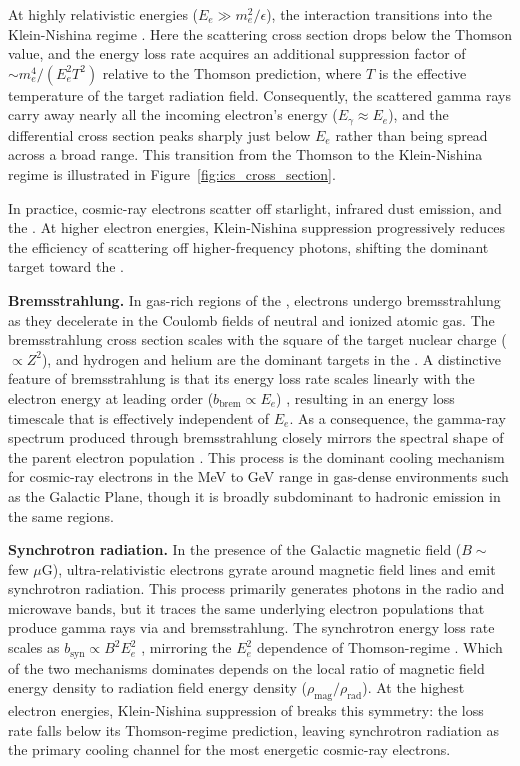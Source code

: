 At highly relativistic energies ($E_e \gg m_e^2/\epsilon$), the interaction transitions into the Klein-Nishina regime \cite{Hooper:2024}.
Here the scattering cross section drops below the Thomson value, and the energy loss rate acquires an additional suppression factor of $\sim m_e^4 / (E_e^2 T^2)$ relative to the Thomson prediction, where $T$ is the effective temperature of the target radiation field.
Consequently, the scattered gamma rays carry away nearly all the incoming electron's energy ($E_\gamma \approx E_e$), and the differential cross section peaks sharply just below $E_e$ rather than being spread across a broad range.
This transition from the Thomson to the Klein-Nishina regime is illustrated in Figure~\ref{fig:ics_cross_section}.

In practice, cosmic-ray electrons scatter off starlight, infrared dust emission, and the \CMB.
At higher electron energies, Klein-Nishina suppression progressively reduces the efficiency of scattering off higher-frequency photons, shifting the dominant \ICS target toward the \CMB.

\textbf{Bremsstrahlung.}
In gas-rich regions of the \ISM, electrons undergo
bremsstrahlung as they decelerate in the Coulomb fields of neutral and ionized atomic gas.
The bremsstrahlung cross section scales with the square of the target nuclear charge ($\propto Z^2$), and hydrogen and helium are the dominant targets in the \ISM.
A distinctive feature of bremsstrahlung is that its energy loss rate scales linearly with the electron energy at leading order ($b_\text{brem} \propto E_e$) \cite{Pinetti:2021jjs}, resulting in an energy loss timescale that is effectively independent of $E_e$.
As a consequence, the gamma-ray spectrum produced through bremsstrahlung closely mirrors the spectral shape of the parent electron population \cite{Hooper:2024}.
This process is the dominant cooling mechanism for cosmic-ray electrons in the MeV to GeV range in gas-dense environments such as the Galactic Plane, though it is broadly subdominant to hadronic emission in the same regions.

\textbf{Synchrotron radiation.}
In the presence of the Galactic magnetic field ($B \sim$ few $\mu$G), ultra-relativistic electrons gyrate around magnetic field lines and emit synchrotron radiation.
This process primarily generates photons in the radio and microwave bands, but it traces the same underlying electron populations that produce gamma rays via \ICS and bremsstrahlung.
The synchrotron energy loss rate scales as $b_\text{syn} \propto B^2 E_e^2$ \cite{Hooper:2024}, mirroring the $E_e^2$ dependence of Thomson-regime \ICS.
Which of the two mechanisms dominates depends on the local ratio of magnetic field energy density to radiation field energy density ($\rho_\text{mag}/\rho_\text{rad}$).
At the highest electron energies, Klein-Nishina suppression of \ICS breaks this symmetry: the \ICS loss rate falls below its Thomson-regime prediction, leaving synchrotron radiation as the primary cooling channel for the most energetic cosmic-ray electrons.

